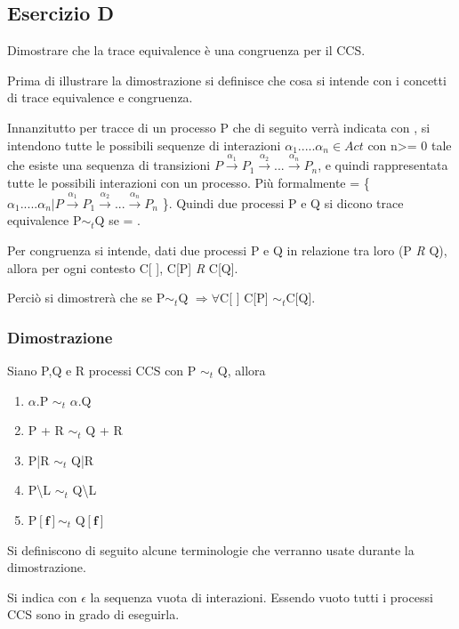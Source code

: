 \pagebreak
\subsection{Esercizio D} 
Dimostrare che la trace equivalence è una congruenza per il CCS.

Prima di illustrare la dimostrazione si definisce che cosa si intende con i concetti di trace equivalence e congruenza.

Innanzitutto per tracce di un processo P che di seguito verrà indicata con , si intendono tutte le possibili sequenze di interazioni $\alpha_{1}.....\alpha_{n} \in Act$ con n>= 0 tale che esiste una sequenza di transizioni $P \overset{\alpha_{1}}\rightarrow P_{1} \overset{\alpha_{2}}\rightarrow...\overset{\alpha_{n}}\rightarrow P_{n}$, e quindi rappresentata tutte le possibili interazioni con un processo. Più formalmente  = \{ $\alpha_{1}.....\alpha_{n} | P \overset{\alpha_{1}}\rightarrow P_{1} \overset{\alpha_{2}}\rightarrow...\overset{\alpha_{n}}\rightarrow P_{n}$ \}. Quindi due processi P e Q si dicono trace equivalence P$\sim_{t}$Q se  = .

Per congruenza si intende, dati due processi P e Q in relazione tra loro (P \textit{R} Q), allora per ogni contesto C[ ], C[P] \textit{R} C[Q]. 

Perciò si dimostrerà che se P$\sim_{t}$Q $\Rightarrow \forall$C[ ] C[P] $\sim_{t}$C[Q].

\subsubsection{Dimostrazione} 

Siano P,Q e R processi CCS con P $\sim_{t}$ Q, allora 

\begin{enumerate}
	\item $\alpha$.P $\sim_{t}$ $\alpha$.Q
	\item P + R $\sim_{t}$ Q + R
	\item P|R $\sim_{t}$ Q|R
	\item P\textbackslash L $\sim_{t}$ Q\textbackslash L
	\item P$\mathbf{[f]}\sim_{t}$ Q$\mathbf{[f]}$
\end{enumerate}

Si definiscono di seguito alcune terminologie che verranno usate durante la dimostrazione.

Si indica con $\epsilon$ la sequenza vuota di interazioni. Essendo vuoto tutti i processi CCS sono in grado di eseguirla.

